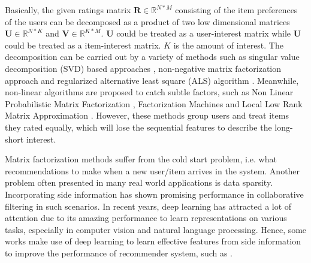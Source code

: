 \documentclass{llncs}
\begin{document}
Basically, the given ratings matrix $\mathbf{R} \in \mathbb{R}^{N*M}$
consisting of the item preferences of the users can be decomposed as
a product of two low dimensional matrices $\mathbf{U} \in \mathbb{R}^{N*K}$
and $\mathbf{V} \in \mathbb{R}^{K*M}$.
$\mathbf{U}$ could be treated as a user-interest matrix while
$\mathbf{U}$ could be treated as a item-interest matrix.
$K$ is the amount of interest.
The decomposition can be carried out by a variety of methods
such as singular value decomposition (SVD) based approaches \cite{mazumder2010spectral},
non-negative matrix factorization approach \cite{lee2001algorithms}
and regularized alternative least square (ALS) algorithm \cite{zhou2008large}.
Meanwhile, non-linear algorithms are proposed to catch subtle factors,
such as Non Linear Probabilistic Matrix Factorization \cite{lawrence2009non},
Factorization Machines \cite{rendle2010factorization} and
Local Low Rank Matrix Approximation \cite{lee2013local}.
However, these methods group users and treat items they rated equally,
which will lose the sequential features to describe the long-short interest.

Matrix factorization methods suffer from the cold start problem,
i.e. what recommendations to make when a new user/item arrives in the system.
Another problem often presented in many real world applications is data sparsity.
Incorporating side information has shown promising performance
in collaborative filtering in such scenarios.
In recent years, deep learning \cite{hinton2006reducing, hinton2006fast}
has attracted a lot of attention due to its amazing performance
to learn representations on various tasks,
especially in computer vision and natural language processing.
Hence, some works make use of deep learning to learn effective
features from side information to improve the performance of recommender system,
such as \cite{salakhutdinov2007restricted, van2013deep, wang2015collaborative, li2015deep}.
\end{document}
